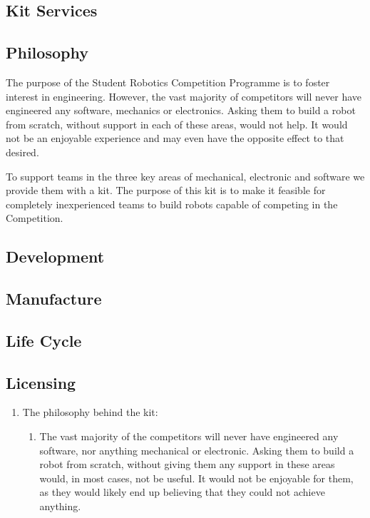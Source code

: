 \begin{draft}
\section{Kit Services}

\subsection{Philosophy}

The purpose of the Student Robotics Competition Programme is to foster interest in engineering. However, the vast majority of competitors will never have engineered any software, mechanics or electronics. Asking them to build a robot from scratch, without support in each of these areas, would not help. It would not be an enjoyable experience and may even have the opposite effect to that desired.

To support teams in the three key areas of mechanical, electronic and software we provide them with a kit. The purpose of this kit is to make it feasible for completely inexperienced teams to build robots capable of competing in the Competition.

\subsection{Development}

\subsection{Manufacture}

\subsection{Life Cycle}

\subsection{Licensing}

\begin{enumerate}


\item The philosophy behind the kit:

  \begin{enumerate}

    \item The vast majority of the competitors will never have engineered any software, nor anything mechanical or electronic.  Asking them to build a robot from scratch, without giving them any support in these areas would, in most cases, not be useful.  It would not be enjoyable for them, as they would likely end up believing that they could not achieve anything.


\end{enumerate}
\end{enumerate}
\end{draft}

